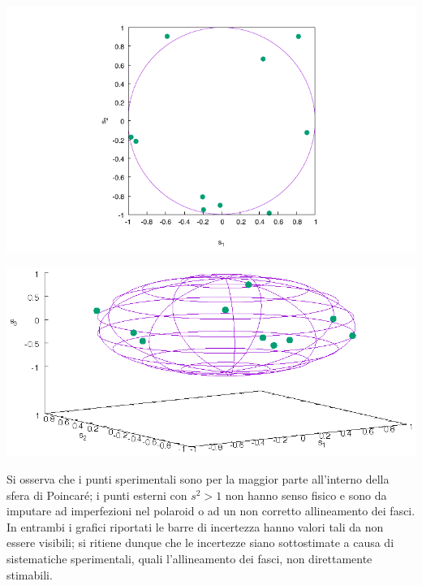 \documentclass[10pt,oneside,a4paper]{article}
\newenvironment{Figure}
  {\par\medskip\noindent\minipage{\linewidth}}
  {\endminipage\par\medskip}
\begin{document}
\begin{multicols}{2}
\begin{Figure}
	\begin{center}
	\includegraphics[width=\linewidth]{piano}
	\label{fig:piano}
	\end{center}
\end{Figure}
\begin{Figure}
	\begin{center}
	\includegraphics[width=\linewidth]{spazio}
	\label{fig:spazio}
	\end{center}
\end{Figure}

Si osserva che i punti sperimentali sono per la maggior parte all'interno della sfera di Poincaré; i punti esterni con $s^2>1$ non hanno senso fisico e sono da imputare ad imperfezioni nel polaroid o ad un non corretto allineamento dei fasci. In entrambi i grafici riportati le barre di incertezza hanno valori tali da non essere visibili; si ritiene dunque che le incertezze siano sottostimate a causa di sistematiche sperimentali, quali l'allineamento dei fasci, non direttamente stimabili.




\end{multicols}
\end{document}
